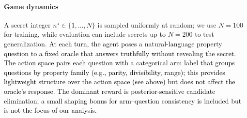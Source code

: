 \documentclass[11pt]{article}
\newcommand{\an}[1]{\textcolor{black}{#1}}
\theoremstyle{plain}
\theoremstyle{definition}
\theoremstyle{remark}
\begin{document}
\paragraph{Game dynamics}  A secret integer \(n^\star \in \{1,\ldots,N\}\) is sampled uniformly at random; we use \(N=100\) for training, while evaluation can include secrets up to \(N=200\) to test generalization. \an{At each turn, the agent poses a natural-language property
question to a fixed oracle that answers truthfully without
revealing the secret. The action space pairs each question
with a categorical arm label that groups questions by
property family (e.g., parity, divisibility, range);
this provides lightweight structure over the action space (see above)
but does not affect the oracle's response. The dominant
reward is posterior-sensitive candidate elimination; a
small shaping bonus for arm--question consistency is
included but is not the focus of our analysis.}



\end{document}
